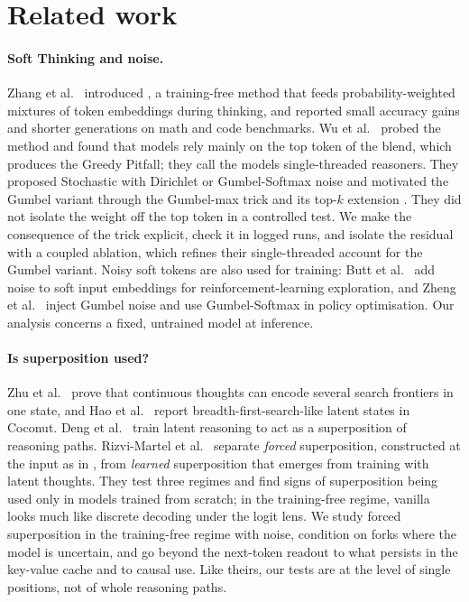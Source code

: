 \section{Related work}\label{sec:related}

\paragraph{Soft Thinking and noise.}
Zhang et al.~\cite{zhang2025soft} introduced \ST{}, a training-free method that feeds probability-weighted mixtures of token
embeddings during thinking, and reported small accuracy gains and shorter generations on math and code benchmarks.
Wu et al.~\cite{wu2025single} probed the method and found that models rely mainly on the top token of the blend, which
produces the Greedy Pitfall; they call the models single-threaded reasoners.
They proposed Stochastic \ST{} with Dirichlet or Gumbel-Softmax noise \cite{jang2017categorical,maddison2017concrete}
and motivated the Gumbel variant through the Gumbel-max trick and its top-$k$ extension \cite{kool2019stochastic}.
They did not isolate the weight off the top token in a controlled test.
We make the consequence of the trick explicit, check it in logged runs, and isolate the residual with a coupled
ablation, which refines their single-threaded account for the Gumbel variant.
Noisy soft tokens are also used for training: Butt et al.~\cite{butt2025soft} add noise to soft input embeddings for
reinforcement-learning exploration, and Zheng et al.~\cite{zheng2025softgrpo} inject Gumbel noise and use Gumbel-Softmax in
policy optimisation.
Our analysis concerns a fixed, untrained model at inference.

\paragraph{Is superposition used?}
Zhu et al.~\cite{zhu2025superposition} prove that continuous thoughts can encode several search frontiers in one state, and
Hao et al.~\cite{hao2024coconut} report breadth-first-search-like latent states in Coconut.
Deng et al.~\cite{deng2025latent} train latent reasoning to act as a superposition of reasoning paths.
Rizvi-Martel et al.~\cite{rizvimartel2026illusion} separate \emph{forced} superposition, constructed at the input as in \ST{}, from
\emph{learned} superposition that emerges from training with latent thoughts.
They test three regimes and find signs of superposition being used only in models trained from scratch; in the
training-free regime, vanilla \ST{} looks much like discrete decoding under the logit lens.
We study forced superposition in the training-free regime with noise, condition on forks where the model is
uncertain, and go beyond the next-token readout to what persists in the key-value cache and to causal use.
Like theirs, our tests are at the level of single positions, not of whole reasoning paths.

